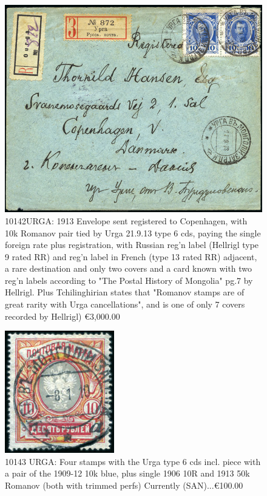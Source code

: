 \begin{figure}[htbp]
\centering
\includegraphics[width=.95\textwidth]{../russian-post-in-mongolia/10142.jpg}
\caption{ 
10142URGA: 1913 Envelope sent registered to Copenhagen, with 10k Romanov pair
tied by Urga 21.9.13 type 6 cds, paying the single foreign rate plus
registration, with Russian reg'n label (Hellrigl type 9 rated RR) and reg'n
label in French (type 13 rated RR) adjacent, a rare destination and only two
covers and a card known with two reg'n labels according to 
"The Postal History of Mongolia" pg.7 by Hellrigl. Plus Tchilinghirian
states that "Romanov stamps are of great rarity with Urga cancellations",
and is one of only 7 covers recorded by Hellrigl)
\euro 3,000.00 
} 
\end{figure}  

\begin{figure}[htbp]
\centering
\includegraphics[width=.35\textwidth]{../russian-post-in-mongolia/10143.jpg}
\caption{ 
10143 URGA: Four stamps with the Urga type 6 cds incl. piece with a pair of the
1909-12 10k blue, plus single 1906 10R and 1913 50k Romanov (both with trimmed perfs)
Currently (SAN)...\euro 100.00 
} 
\end{figure}  

